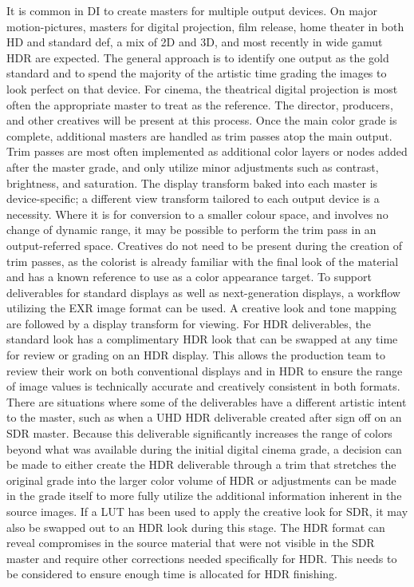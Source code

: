 It is common in DI to create masters for multiple output devices. On major motion-pictures, masters for digital projection, film release, home theater in both HD and standard def, a mix of 2D and 3D, and most recently in wide gamut HDR are expected. The general approach is to identify one output as the gold standard and to spend the majority of the artistic time grading the images to look perfect on that device. For cinema, the theatrical digital projection is most often the appropriate master to treat as the reference. The director, producers, and other creatives will be present at this process. Once the main color grade is complete, additional masters are handled as trim passes atop the main output. Trim passes are most often implemented as additional color layers or nodes added after the master grade, and only utilize minor adjustments such as contrast, brightness, and saturation. The display transform baked into each master is device-specific; a different view transform tailored to each output device is a necessity. Where it is for conversion to a smaller colour space, and involves no change of dynamic range, it may be possible to perform the trim pass in an output-referred space. Creatives do not need to be present during the creation of trim passes, as the colorist is already familiar with the final look of the material and has a known reference to use as a color appearance target.
To support deliverables for standard displays as well as next-generation displays, a workflow utilizing the EXR image format can be used. A creative look and tone mapping are followed by a display transform for viewing. For HDR deliverables, the standard look has a complimentary HDR look that can be swapped at any time for review or grading on an HDR display. This allows the production team to review their work on both conventional displays and in HDR to ensure the range of image values is technically accurate and creatively consistent in both formats.
There are situations where some of the deliverables have a different artistic intent to the master, such as when a UHD HDR deliverable created after sign off on an SDR master. Because this deliverable significantly increases the range of colors beyond what was available during the initial digital cinema grade, a decision can be made to either create the HDR deliverable through a trim that stretches the original grade into the larger color volume of HDR or adjustments can be made in the grade itself to more fully utilize the additional information inherent in the source images. If a LUT has been used to apply the creative look for SDR, it may also be swapped out to an HDR look during this stage. The HDR format can reveal compromises in the source material that were not visible in the SDR master and require other corrections needed specifically for HDR. This needs to be considered to ensure enough time is allocated for HDR finishing.

